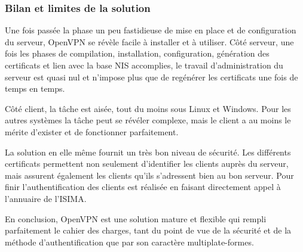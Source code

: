 \subsubsection{Bilan et limites de la solution}

Une fois passée la phase un peu fastidieuse de mise en place et de configuration du serveur, OpenVPN se révèle facile à installer et à utiliser. Côté serveur, une fois les phases de compilation, installation, configuration, génération des certificats et lien avec la base NIS accomplies, le travail d'administration du serveur est quasi nul et n'impose plus que de regénérer les certificats une fois de temps en temps.

Côté client, la tâche est aisée, tout du moins sous Linux et Windows. Pour les autres systèmes la tâche peut se révéler complexe, mais le client a au moins le mérite d'exister et de fonctionner parfaitement.

La solution en elle même fournit un très bon niveau de sécurité. Les différents certificats permettent non seulement d'identifier les clients auprès du serveur, mais assurent également les clients qu'ils s'adressent bien au bon serveur. Pour finir l'authentification des clients est réalisée en faisant directement appel à l'annuaire de l'ISIMA.

En conclusion, OpenVPN est une solution mature et flexible qui rempli parfaitement le cahier des charges, tant du point de vue de la sécurité et de la méthode d'authentification que par son caractère multiplate-formes.


% 
